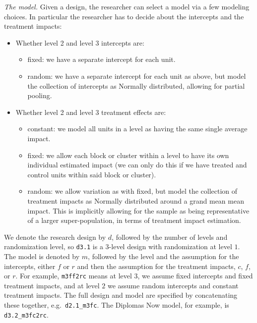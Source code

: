 \documentclass[
]{article}
\providecommand{\tightlist}{%
  \setlength{\itemsep}{0pt}\setlength{\parskip}{0pt}}
\begin{document}
\emph{The model.} Given a design, the researcher can select a model via
a few modeling choices. In particular the researcher has to decide about
the intercepts and the treatment impacts:

\begin{itemize}
\tightlist
\item
  Whether level 2 and level 3 intercepts are:

  \begin{itemize}
  \tightlist
  \item
    fixed: we have a separate intercept for each unit.
  \item
    random: we have a separate intercept for each unit as above, but
    model the collection of intercepts as Normally distributed, allowing
    for partial pooling.
  \end{itemize}
\item
  Whether level 2 and level 3 treatment effects are:

  \begin{itemize}
  \tightlist
  \item
    constant: we model all units in a level as having the same single
    average impact.
  \item
    fixed: we allow each block or cluster within a level to have its own
    individual estimated impact (we can only do this if we have treated
    and control units within said block or cluster).
  \item
    random: we allow variation as with fixed, but model the collection
    of treatment impacts as Normally distributed around a grand mean
    mean impact. This is implicitly allowing for the sample as being
    representative of a larger super-population, in terms of treatment
    impact estimation.
  \end{itemize}
\end{itemize}

We denote the research design by \(d\), followed by the number of levels
and randomization level, so \texttt{d3.1} is a \(3\)-level design with
randomization at level \(1\). The model is denoted by \(m\), followed by
the level and the assumption for the intercepts, either \(f\) or \(r\)
and then the assumption for the treatment impacts, \(c\), \(f\), or
\(r\). For example, \texttt{m3ff2rc} means at level \(3\), we assume
fixed intercepts and fixed treatment impacts, and at level \(2\) we
assume random intercepts and constant treatment impacts. The full design
and model are specified by concatenating these together,
e.g.~\texttt{d2.1\_m3fc}. The Diplomas Now model, for example, is
\texttt{d3.2\_m3fc2rc}.
\end{document}
